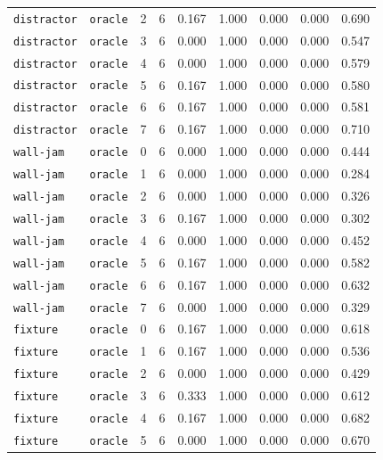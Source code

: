 \documentclass{article}
\begin{document}
\begin{center}
\begin{tabular}{lllcccccc}
\texttt{distractor} & \texttt{oracle} & 2 & 6 & 0.167 & 1.000 & 0.000 & 0.000 & 0.690 \\
\texttt{distractor} & \texttt{oracle} & 3 & 6 & 0.000 & 1.000 & 0.000 & 0.000 & 0.547 \\
\texttt{distractor} & \texttt{oracle} & 4 & 6 & 0.000 & 1.000 & 0.000 & 0.000 & 0.579 \\
\texttt{distractor} & \texttt{oracle} & 5 & 6 & 0.167 & 1.000 & 0.000 & 0.000 & 0.580 \\
\texttt{distractor} & \texttt{oracle} & 6 & 6 & 0.167 & 1.000 & 0.000 & 0.000 & 0.581 \\
\texttt{distractor} & \texttt{oracle} & 7 & 6 & 0.167 & 1.000 & 0.000 & 0.000 & 0.710 \\
\texttt{wall-jam} & \texttt{oracle} & 0 & 6 & 0.000 & 1.000 & 0.000 & 0.000 & 0.444 \\
\texttt{wall-jam} & \texttt{oracle} & 1 & 6 & 0.000 & 1.000 & 0.000 & 0.000 & 0.284 \\
\texttt{wall-jam} & \texttt{oracle} & 2 & 6 & 0.000 & 1.000 & 0.000 & 0.000 & 0.326 \\
\texttt{wall-jam} & \texttt{oracle} & 3 & 6 & 0.167 & 1.000 & 0.000 & 0.000 & 0.302 \\
\texttt{wall-jam} & \texttt{oracle} & 4 & 6 & 0.000 & 1.000 & 0.000 & 0.000 & 0.452 \\
\texttt{wall-jam} & \texttt{oracle} & 5 & 6 & 0.167 & 1.000 & 0.000 & 0.000 & 0.582 \\
\texttt{wall-jam} & \texttt{oracle} & 6 & 6 & 0.167 & 1.000 & 0.000 & 0.000 & 0.632 \\
\texttt{wall-jam} & \texttt{oracle} & 7 & 6 & 0.000 & 1.000 & 0.000 & 0.000 & 0.329 \\
\texttt{fixture} & \texttt{oracle} & 0 & 6 & 0.167 & 1.000 & 0.000 & 0.000 & 0.618 \\
\texttt{fixture} & \texttt{oracle} & 1 & 6 & 0.167 & 1.000 & 0.000 & 0.000 & 0.536 \\
\texttt{fixture} & \texttt{oracle} & 2 & 6 & 0.000 & 1.000 & 0.000 & 0.000 & 0.429 \\
\texttt{fixture} & \texttt{oracle} & 3 & 6 & 0.333 & 1.000 & 0.000 & 0.000 & 0.612 \\
\texttt{fixture} & \texttt{oracle} & 4 & 6 & 0.167 & 1.000 & 0.000 & 0.000 & 0.682 \\
\texttt{fixture} & \texttt{oracle} & 5 & 6 & 0.000 & 1.000 & 0.000 & 0.000 & 0.670 \\
\bottomrule
\end{tabular}
\end{center}
\end{document}
